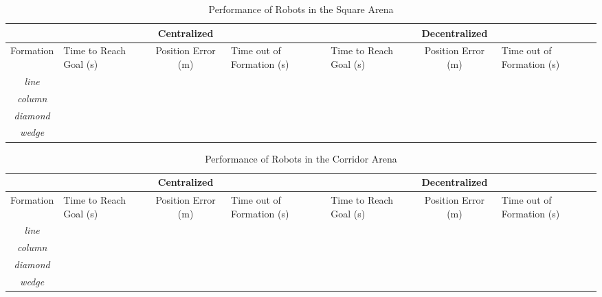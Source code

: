 \documentclass[letterpaper, 10 pt, conference]{ieeeconf}  %
\begin{document}
\begin{table}[t]
\begin{tabular}{@{}cp{1.75cm}cp{1.5cm}p{1.75cm}cp{1.5cm}@{}}
\toprule
\multicolumn{1}{l}{} & \multicolumn{1}{l}{}   & Centralized        & \multicolumn{1}{l}{}      & \multicolumn{1}{l}{}   & Decentralized      & \multicolumn{1}{l}{}      \\ \midrule
Formation            & Time to Reach Goal (s) & Position Error (m) & Time out of Formation (s) & Time to Reach Goal (s) & Position Error (m) & Time out of Formation (s) \\
\textit{line}        &                        &                    &                           &                        &                    &                           \\
\textit{column}      &                        &                    &                           &                        &                    &                           \\
\textit{diamond}     &                        &                    &                           &                        &                    &                           \\
\textit{wedge}       &                        &                    &                           &                        &                    &                           \\ \bottomrule
\end{tabular}
\caption{Performance of Robots in the Square Arena}
\label{tab:results_square}
\end{table}

\begin{table}[t]
\begin{tabular}{@{}cp{1.75cm}cp{1.5cm}p{1.75cm}cp{1.5cm}@{}}
\toprule
\multicolumn{1}{l}{} & \multicolumn{1}{l}{}   & Centralized        & \multicolumn{1}{l}{}      & \multicolumn{1}{l}{}   & Decentralized      & \multicolumn{1}{l}{}      \\ \midrule
Formation            & Time to Reach Goal (s) & Position Error (m) & Time out of Formation (s) & Time to Reach Goal (s) & Position Error (m) & Time out of Formation (s) \\
\textit{line}        &                        &                    &                           &                        &                    &                           \\
\textit{column}      &                        &                    &                           &                        &                    &                           \\
\textit{diamond}     &                        &                    &                           &                        &                    &                           \\
\textit{wedge}       &                        &                    &                           &                        &                    &                           \\ \bottomrule
\end{tabular}
\caption{Performance of Robots in the Corridor Arena}
\label{tab:results_square}
\end{table}
\end{document}

